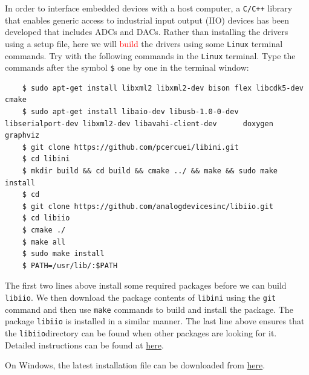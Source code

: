 \documentclass[11pt]{article}
\begin{document}
In order to interface embedded devices with a host computer, a \texttt{C/C++} library that enables generic access to industrial input output (IIO) devices has been developed that includes ADCs and DACs. Rather than installing the drivers using a setup file, here we will \textcolor{red}{build} the drivers using some \texttt{Linux} terminal commands. Try with the following commands in the \texttt{Linux} terminal. Type the commands after the symbol \texttt{\$} one by one in the terminal window:
\begin{mdframed}[backgroundcolor=gray!20]
  \tiny
  \begin{verbatim}
    $ sudo apt-get install libxml2 libxml2-dev bison flex libcdk5-dev cmake
    $ sudo apt-get install libaio-dev libusb-1.0-0-dev      libserialport-dev libxml2-dev libavahi-client-dev      doxygen graphviz
    $ git clone https://github.com/pcercuei/libini.git
    $ cd libini
    $ mkdir build && cd build && cmake ../ && make && sudo make install
    $ cd 
    $ git clone https://github.com/analogdevicesinc/libiio.git
    $ cd libiio
    $ cmake ./
    $ make all
    $ sudo make install
    $ PATH=/usr/lib/:$PATH
  \end{verbatim}
\end{mdframed}

The first two lines above install some required packages before we can build \texttt{libiio}. We then download the package contents of \texttt{libini} using the \texttt{git} command and then use \texttt{make} commands to build and install the package. The package \texttt{libiio} is installed in a similar manner. The last line above ensures that the \texttt{libiio}directory can be found when other packages are looking for it. Detailed instructions can be found at \href{https://wiki.analog.com/resources/tools-software/linux-software/libiio}{here}.

\begin{tcolorbox}[colback=blue!5]
  On Windows, the latest installation file can be downloaded from \href{https://github.com/analogdevicesinc/libiio/releases}{here}.
\end{tcolorbox}
\end{document}
